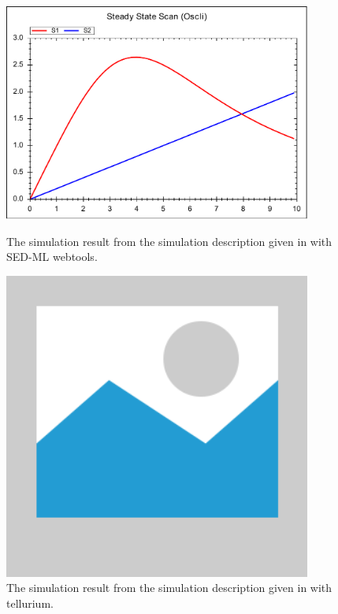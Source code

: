 \begin{figure}[ht]
    \centering
    \begin{minipage}{0.45\textwidth}
        \centering
        \includegraphics[width=0.9\textwidth]{examples/repeated-steady-scan-oscli/results/repeated-steady-scan-oscli}
        \caption{The simulation result from the simulation description given in  with SED-ML webtools.}
    \end{minipage}\hfill
    \begin{minipage}{0.45\textwidth}
        \centering
        \includegraphics[width=0.9\textwidth]{examples/placeholder}
        \caption{The simulation result from the simulation description given in  with tellurium.}
    \end{minipage}
    \label{fig:repeated-steady-scan-oscli}
\end{figure}

